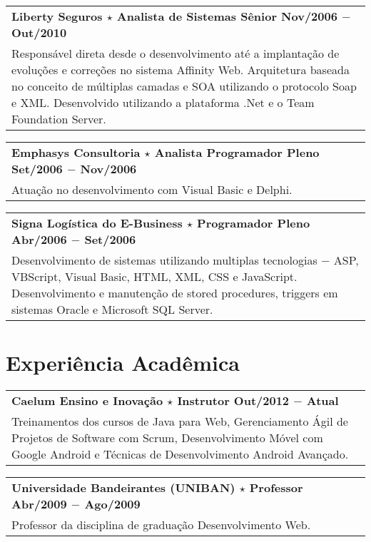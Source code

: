 \documentclass[a4paper, oneside, final]{scrartcl}
\newcommand{\vspc}{\vspace{0.15cm}} %
\begin{document}
\begin{center}
\begin{tabularx}{1\linewidth}{X}
{\bf Liberty Seguros $\star$ Analista de Sistemas Sênior \hfill Nov/2006 $-$ Out/2010} \\
Responsável direta desde o desenvolvimento até a implantação de evoluções e correções no sistema Affinity Web. Arquitetura baseada no conceito de múltiplas camadas e SOA utilizando o protocolo Soap e XML. Desenvolvido utilizando a plataforma .Net e o Team Foundation Server.\vspc\\
\end{tabularx}

\begin{tabularx}{1\linewidth}{X}
{\bf Emphasys Consultoria $\star$ Analista Programador Pleno  \hfill Set/2006 $-$ Nov/2006} \\
Atuação no desenvolvimento com Visual Basic e Delphi. \vspc\\
\end{tabularx}

\begin{tabularx}{1\linewidth}{X}
{\bf Signa Logística do E-Business $\star$ Programador Pleno  \hfill Abr/2006 $-$ Set/2006} \\
Desenvolvimento de sistemas utilizando multiplas tecnologias $-$ ASP, VBScript, Visual Basic, HTML, XML, CSS e JavaScript. Desenvolvimento e manutenção de stored procedures, triggers em sistemas Oracle e Microsoft SQL Server. \vspc\\
\end{tabularx}

\section{Experiência Acadêmica}
\begin{tabularx}{1\linewidth}{X}
{\bf Caelum Ensino e Inovação $\star$ Instrutor  \hfill Out/2012 $-$ Atual} \\
Treinamentos dos cursos de Java para Web, Gerenciamento Ágil de Projetos de Software com Scrum, Desenvolvimento Móvel com Google Android e Técnicas de Desenvolvimento Android Avançado. \vspc\\
\end{tabularx}

\begin{tabularx}{1\linewidth}{X}
{\bf Universidade Bandeirantes (UNIBAN) $\star$ Professor \hfill Abr/2009 $-$ Ago/2009} \\
Professor da disciplina de graduação Desenvolvimento Web. \vspc\\
\end{tabularx}


\end{center}
\end{document}
